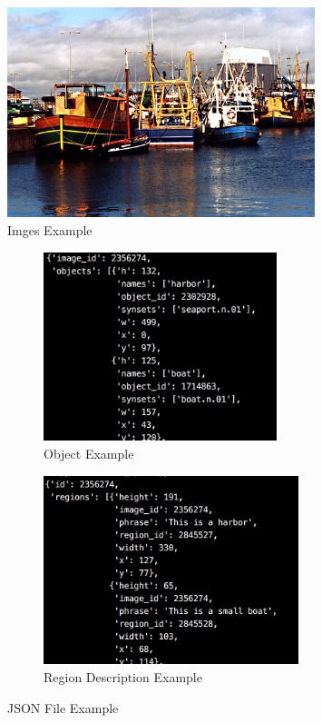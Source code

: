 \documentclass[12pt,a4paper]{report}
\begin{document}
\begin{figure}[h]
\centering
\includegraphics[width=0.8\textwidth]{2356274.jpg}
\caption{Imges Example}

\end{figure}
\newpage

\begin{figure}[h]
\begin{subfigure}{0.5\linewidth}
	\includegraphics[height=5.5cm,width=\textwidth]{object.png}
	\caption{Object Example}
\end{subfigure}
\begin{subfigure}{0.5\linewidth}
	\includegraphics[height=5.5cm,width=\textwidth]{region.png}
	\caption{Region Description Example}
\end{subfigure}
\label{dataset example}
\caption{JSON File Example}
\end{figure}
\end{document}
